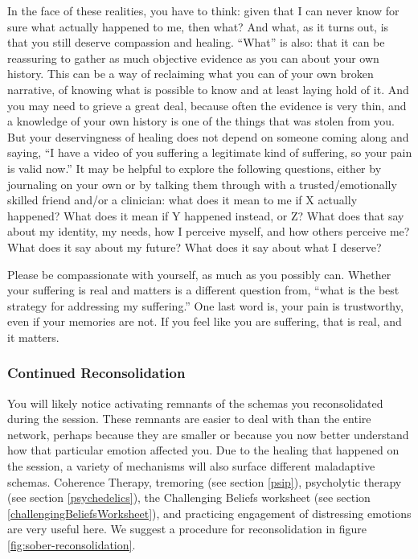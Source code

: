 \documentclass[12pt,letterpaper]{article}
\begin{document}
In the face of these realities, you have to think: given that I can never know for sure what actually happened to me, then what?  And what, as it turns out, is that you still deserve compassion and healing.  “What” is also: that it can be reassuring to gather as much objective evidence as you can about your own history. This can be a way of reclaiming what you can of your own broken narrative, of knowing what is possible to know and at least laying hold of it. And you may need to grieve a great deal, because often the evidence is very thin, and a knowledge of your own history is one of the things that was stolen from you. But your deservingness of healing does not depend on someone coming along and saying, “I have a video of you suffering a legitimate kind of suffering, so your pain is valid now.” It may be helpful to explore the following questions, either by journaling on your own or by talking them through with a trusted/emotionally skilled friend and/or a clinician: what does it mean to me if X actually happened? What does it mean if Y happened instead, or Z? What does that say about my identity, my needs, how I perceive myself, and how others perceive me? What does it say about my future? What does it say about what I deserve?

Please be compassionate with yourself, as much as you possibly can. Whether your suffering is real and matters is a different question from, “what is the best strategy for addressing my suffering.” One last word is, your pain is trustworthy, even if your memories are not. If you feel like you are suffering, that is real, and it matters.
\subsubsection{Continued Reconsolidation}
\label{sec:reconsolidation}
You will likely notice activating remnants of the schemas you reconsolidated during the session. These remnants are easier to deal with than the entire network, perhaps because they are smaller or because you now better understand how that particular emotion affected you. Due to the healing that happened on the session, a variety of mechanisms will also surface different maladaptive schemas. Coherence Therapy, tremoring (see section \ref{psip}), psycholytic therapy (see section \ref{psychedelics}), the Challenging Beliefs worksheet (see section \ref{challengingBeliefsWorksheet}), and practicing engagement of distressing emotions are very useful here. We suggest a procedure for reconsolidation in figure \ref{fig:sober-reconsolidation}.
\end{document}
